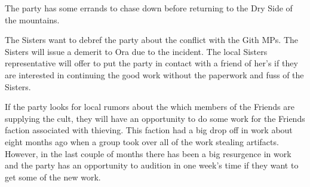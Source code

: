 The party has some errands to chase down before returning to the Dry Side of the mountains.

The Sisters want to debref the party about the conflict with the Gith MPs.
The Sisters will issue a demerit to Ora due to the incident.
The local Sisters representative will offer to put the party in contact with a friend of her's if they are interested in continuing the good work without the paperwork and fuss of the Sisters.

If the party looks for local rumors about the which members of the Friends are supplying the cult, they will have an opportunity to do some work for the Friends faction associated with thieving.
This faction had a big drop off in work about eight months ago when a group took over all of  the work stealing artifacts.
However, in the last couple of months there has been a big resurgence in work and the party has an opportunity to audition in one week's time if they want to get some of the new work.